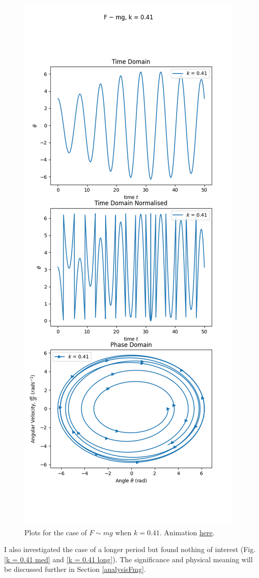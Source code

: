 \documentclass[10pt, twocolumn]{article}
\begin{document}
\begin{figure}[H]
    \centering
    \includegraphics[width = 0.9\columnwidth]{Projects/ForcedSimplePendulum/Plots/Plot of F~mg, k is 0.41.png}
    \caption{Plots for the case of $F\sim{mg}$ when $k = 0.41$. Animation \href{https://github.com/linsuong/PHYS-6017-Labs/blob/main/Projects/ForcedSimplePendulum/Plots/F~mg\%2C\%20k\%20is\%200.41.gif}{here}.}
    \label{k = 0.41}
\end{figure}
I also investigated the case of a longer period but found nothing of interest (Fig. \ref{k = 0.41 med} and \ref{k = 0.41 long}). The significance and physical meaning will be discussed further in Section \ref{analysisFmg}.
\onecolumn
\end{document}
